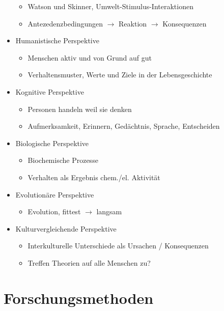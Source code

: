 \documentclass[11pt, paper=a4, twocolumn]{scrartcl}
\begin{document}
\begin{itemize}
			\begin{itemize}
				\item Watson und Skinner, Umwelt-Stimulus-Interaktionen
				\item Antezedenzbedingungen $\rightarrow$ Reaktion 
					$\rightarrow$ Konsequenzen
			\end{itemize}
		\item Humanistische Perspektive
			\begin{itemize}
				\item Menschen aktiv und von Grund auf gut
				\item Verhaltensmuster, Werte und Ziele in der Lebensgeschichte
			\end{itemize}	
		\item Kognitive Perspektive
			\begin{itemize}
				\item Personen handeln weil sie denken
				\item Aufmerksamkeit, Erinnern, Gedächtnis, Sprache, Entscheiden
			\end{itemize}	
		\item Biologische Perspektive
			\begin{itemize}
				\item Biochemische Prozesse
				\item Verhalten als Ergebnis chem./el. Aktivität
			\end{itemize}
		
		\item Evolutionäre Perspektive
			\begin{itemize}
				\item Evolution, fittest $\rightarrow$ langsam
			\end{itemize}

		\item Kulturvergleichende Perspektive
			\begin{itemize}
				\item Interkulturelle Unterschiede als Ursachen / Konsequenzen
				\item Treffen Theorien auf alle Menschen zu?
			\end{itemize}
	\end{itemize}

	\section{Forschungsmethoden}
\end{document}
